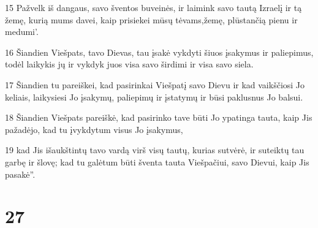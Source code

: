 \par 15 Pažvelk iš dangaus, savo šventos buveinės, ir laimink savo tautą Izraelį ir tą žemę, kurią mums davei, kaip prisiekei mūsų tėvams,­žemę, plūstančią pienu ir medumi’. 
\par 16 Šiandien Viešpats, tavo Dievas, tau įsakė vykdyti šiuos įsakymus ir paliepimus, todėl laikykis jų ir vykdyk juos visa savo širdimi ir visa savo siela. 
\par 17 Šiandien tu pareiškei, kad pasirinkai Viešpatį savo Dievu ir kad vaikščiosi Jo keliais, laikysiesi Jo įsakymų, paliepimų ir įstatymų ir būsi paklusnus Jo balsui. 
\par 18 Šiandien Viešpats pareiškė, kad pasirinko tave būti Jo ypatinga tauta, kaip Jis pažadėjo, kad tu įvykdytum visus Jo įsakymus, 
\par 19 kad Jis išaukštintų tavo vardą virš visų tautų, kurias sutvėrė, ir suteiktų tau garbę ir šlovę; kad tu galėtum būti šventa tauta Viešpačiui, savo Dievui, kaip Jis pasakė”.



\chapter{27}


